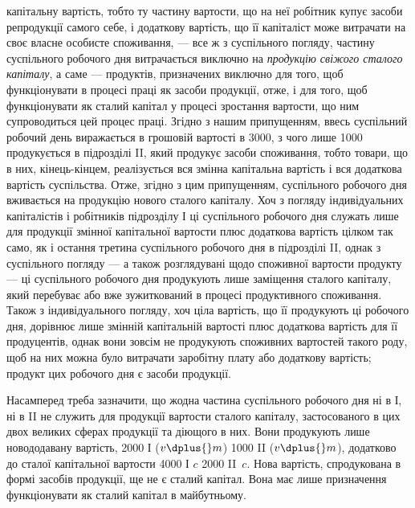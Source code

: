 \parcont{}  %
капітальну вартість, тобто ту частину вартости, що на неї робітник купує
засоби репродукції самого себе, і додаткову вартість, що її капіталіст
може витрачати на своє власне особисте споживання, — все ж з суспільного
погляду, частину суспільного робочого дня витрачається виключно на
\emph{продукцію свіжого сталого капіталу}, а саме — продуктів, призначених
виключно для того, щоб функціонувати в процесі праці як засоби
продукції, отже, і для того, щоб функціонувати як сталий капітал у
процесі зростання вартости, що ним супроводиться цей процес праці.
Згідно з нашим припущенням, ввесь суспільний робочий день виражається в
грошовій вартості в 3000, з чого лише  \deq{} 1000 продукується в підрозділі
II, який продукує засоби споживання, тобто товари, що в них, кінець-кінцем,
реалізується вся змінна капітальна вартість і вся додаткова вартість
суспільства. Отже, згідно з цим припущенням,  суспільного робочого
дня вживається на продукцію нового сталого капіталу. Хоч з погляду
індивідуальних капіталістів і робітників підрозділу І ці  суспільного
робочого дня служать лише для продукції змінної капітальної вартости
плюс додаткова вартість цілком так само, як і остання третина суспільного
робочого дня в підрозділі II, однак з суспільного погляду — а
також розглядувані щодо споживної вартости продукту — ці  суспільного
робочого дня продукують лише заміщення сталого капіталу, який
перебуває або вже зужиткований в процесі продуктивного споживання.
Також з індивідуального погляду, хоч ціла вартість, що її продукують ці
 робочого дня, дорівнює лише змінній капітальній вартості плюс додаткова
вартість для її продуцентів, однак вони зовсім не продукують
споживних вартостей такого роду, щоб на них можна було витрачати
заробітну плату або додаткову вартість; продукт цих  робочого дня є
засоби продукції.

Насамперед треба зазначити, що жодна частина суспільного робочого
дня ні в І, ні в II не служить для продукції вартости сталого капіталу,
застосованого в цих двох великих сферах продукції та діющого в них.
Вони продукують лише новододавану вартість, 2000 І ($v \dplus{} m$) \dplus{} 1000
II ($v \dplus{} m$), додатково до сталої капітальної вартости \deq{} 4000 І $c$ \dplus{} 2000
II~$c$. Нова вартість, спродукована в формі засобів продукції, ще не є
сталий капітал. Вона має лише призначення функціонувати як сталий
капітал в майбутньому.

